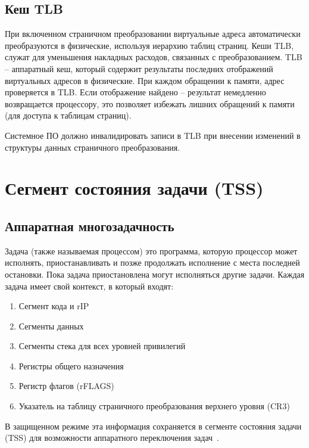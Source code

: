 \subsection{Кеш TLB}
При включенном страничном преобразовании виртуальные адреса автоматически преобразуются в физические,
используя иерархию таблиц страниц. Кеши TLB, служат для уменьшения накладных расходов, связанных с преобразованием.
TLB -- аппаратный кеш, который содержит результаты последних отображений виртуальных адресов в физические.
При каждом обращении к памяти, адрес проверяется в TLB. Если отображение найдено -- результат немедленно возвращается
процессору, это позволяет избежать лишних обращений к памяти (для доступа к таблицам страниц).

Системное ПО должно инвалидировать записи в TLB при внесении изменений
в структуры данных страничного преобразования.



\section{Сегмент состояния задачи (TSS)}
\label{sec:task_state}

\subsection{Аппаратная многозадачность}
Задача (также называемая процессом) это программа, которую процессор может
исполнять, приостанавливать и позже продолжать исполнение с места последней
остановки. Пока задача приостановлена могут исполняться другие задачи. Каждая
задача имеет свой контекст, в который входят:
\begin{enumerate}[1.]
\item Сегмент кода и rIP
\item Сегменты данных
\item Сегменты стека для всех уровней привилегий
\item Регистры общего назначения
\item Регистр флагов (rFLAGS)
\item Указатель на таблицу страничного преобразования верхнего уровня (CR3)
\end{enumerate}

В защищенном режиме эта информация сохраняется в сегменте состояния задачи (TSS)
для возможности аппаратного переключения задач~\cite[стр. 327]{amd_pm_v2}.


